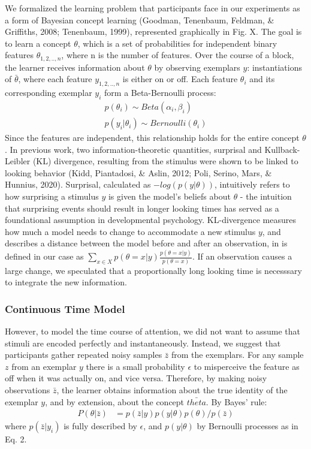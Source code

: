 \documentclass[10pt, letterpaper]{article}
\begin{document}
We formalized the learning problem that participants face in our experiments as a form of Bayesian concept learning (Goodman, Tenenbaum, Feldman, \& Griffiths, 2008; Tenenbaum, 1999), represented graphically in Fig. X. The goal is to learn a concept \(\theta\), which is a set of probabilities for independent binary features \(\theta_{1,2,..,n}\), where n is the number of features. Over the course of a block, the learner receives information about \(\theta\) by observing exemplars \(y\): instantiations of \(\bar{\theta}\), where each feature \(y_{1,2,..,n}\) is either on or off. Each feature \(\theta_i\) and its corresponding exemplar \(y_i\) form a Beta-Bernoulli process:
\begin{eqnarray}
p(\theta_i) \sim Beta(\alpha_i,\beta_i) \\
p(y_i|\theta_i) \sim Bernoulli(\theta_i)
\end{eqnarray}
Since the features are independent, this relationship holds for the entire concept \(\theta\). In previous work, two information-theoretic quantities, surprisal and Kullback-Leibler (KL) divergence, resulting from the stimulus were shown to be linked to looking behavior (Kidd, Piantadosi, \& Aslin, 2012; Poli, Serino, Mars, \& Hunnius, 2020). Surprisal, calculated as \(-log(p(y|\theta))\), intuitively refers to how surprising a stimulus \(y\) is given the model's beliefs about \(\theta\) - the intuition that surprising events should result in longer looking times has served as a foundational assumption in developmental psychology. KL-divergence measures how much a model needs to change to accommodate a new stimulus \(y\), and describes a distance between the model before and after an observation, in is defined in our case as \(\sum_{x \in X}{p(\theta = x|y)\frac{p(\theta = x|y)}{p(\theta = x)}}\). If an observation causes a large change, we speculated that a proportionally long looking time is necesssary to integrate the new information.

\hypertarget{continuous-time-model}{%
\subsubsection{Continuous Time Model}\label{continuous-time-model}}

However, to model the time course of attention, we did not want to assume that stimuli are encoded perfectly and instantaneously. Instead, we suggest that participants gather repeated noisy samples \(\bar{z}\) from the exemplars. For any sample \(z\) from an exemplar \(y\) there is a small probability \(\epsilon\) to misperceive the feature as off when it was actually on, and vice versa.
Therefore, by making noisy observations \(\bar{z}\), the learner obtains information about the true identity of the exemplar \(y\), and by extension, about the concept \(\bar{theta}\). By Bayes' rule:
\begin{eqnarray}
P(\theta|\bar{z}) &= p(\bar{z}|y) p(y|\theta) p(\theta) / p(\bar{z})
\end{eqnarray}
where \(p(\bar{z}|y_i)\) is fully described by \(\epsilon\), and \(p(y|\theta)\) by Bernoulli processes as in Eq. 2.
\end{document}
